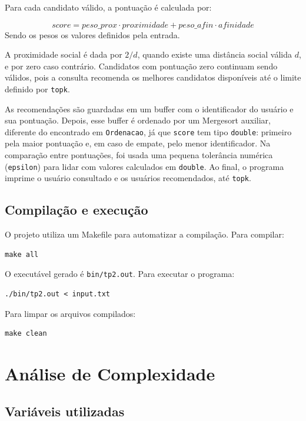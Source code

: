 \documentclass[12pt,a4paper]{article}
\begin{document}
Para cada candidato válido, a pontuação é calculada por:

\[
score = peso\_prox \cdot proximidade + peso\_afin \cdot afinidade
\]
Sendo os pesos os valores definidos pela entrada.

A proximidade social é dada por $2/d$, quando existe uma distância social válida $d$,
e por zero caso contrário. Candidatos com pontuação zero continuam sendo válidos, pois
a consulta recomenda os melhores candidatos disponíveis até o limite definido por
\texttt{topk}.

As recomendações são guardadas em um buffer com o identificador do usuário e sua
pontuação. Depois, esse buffer é ordenado por um Mergesort auxiliar, diferente do encontrado em \texttt{Ordenacao}, já que \texttt{score} tem tipo \texttt{double}: primeiro pela maior pontuação
e, em caso de empate, pelo menor identificador. Na comparação entre pontuações, foi
usada uma pequena tolerância numérica (\texttt{epsilon}) para lidar com valores calculados em
\texttt{double}. Ao final, o programa imprime o usuário consultado e os usuários recomendados, até \texttt{topk}.

\subsection{Compilação e execução}

O projeto utiliza um Makefile para automatizar a compilação. Para compilar:

\begin{verbatim}
make all
\end{verbatim}

O executável gerado é \texttt{bin/tp2.out}. Para executar o programa:

\begin{verbatim}
./bin/tp2.out < input.txt
\end{verbatim}

Para limpar os arquivos compilados:

\begin{verbatim}
make clean
\end{verbatim}

\section{Análise de Complexidade}

\subsection{Variáveis utilizadas}
\end{document}
